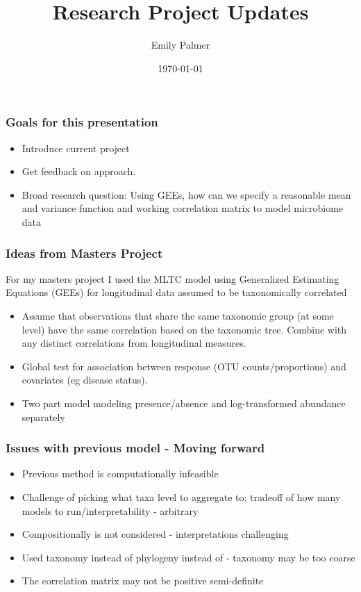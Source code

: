\documentclass{beamer}
\title[]{Research Project Updates}
\author{Emily Palmer} %
\institute[OSU] %
{
Oregon State University \\ %
\medskip
\textit{palmerem@oregonstate.edu} %
}
\date{\today} %
\begin{document}
\begin{frame}
\titlepage %
\end{frame}




\begin{frame}
\frametitle{Goals for this presentation}
\begin{itemize}
  \item Introduce current project
  \item Get feedback on approach.
  \item Broad research question: Using GEEs, how can we specify a reasonable mean and variance function and working correlation matrix to model microbiome data
\end{itemize}
\end{frame}
\begin{frame}
\frametitle{Ideas from Masters Project}
For my masters project I used the MLTC model using Generalized Estimating Equations (GEEs) for longitudinal data assumed to be taxonomically correlated
\begin{itemize}
  \item Assume that observations that share the same taxonomic group (at some level) have the same correlation based on the taxonomic tree. Combine with any distinct correlations from longitudinal measures.
  \item Global test for association between response (OTU counts/proportions) and  covariates (eg disease status).
  \item Two part model modeling presence/absence and log-transformed abundance separately
\end{itemize}
\end{frame}


\begin{frame}
\frametitle{Issues with previous model - Moving forward}
  \begin{itemize}
    \item Previous method is computationally infeasible
    \item Challenge of picking what taxa level to aggregate to: tradeoff of how many models to run/interpretability - arbitrary
    \item Compositionally is not considered - interpretations challenging
    \item Used taxonomy instead of phylogeny instead of - taxonomy may be too coarse
    \item The correlation matrix may not be positive semi-definite
  \end{itemize}
\end{frame}
\end{document}
